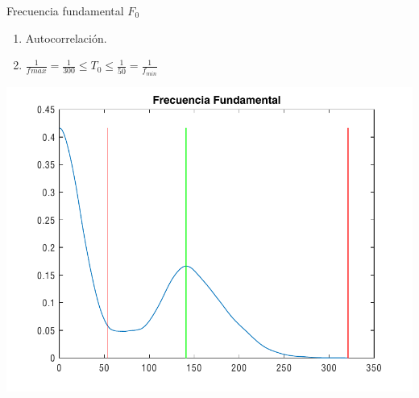 \documentclass{beamer}
\begin{document}
\begin{frame}{Frecuencia fundamental $F_{0}$}

\begin{enumerate}
\item Autocorrelación.
\item $\displaystyle \frac{1}{f_{}max}=
\frac{1}{300} \leq T_{0} \leq \frac{1}{50}=\frac{1}{f_{min}}$
\end{enumerate}

\begin{center}
\includegraphics[scale=0.5]{F0}
\end{center}

\end{frame}
\end{document}
